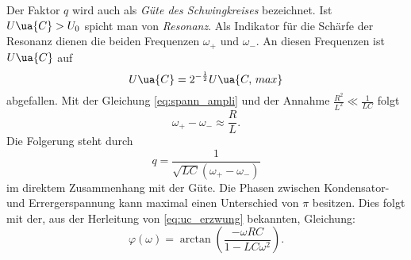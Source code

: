 Der Faktor $q$ wird auch als \emph{Güte des Schwingkreises} bezeichnet.
Ist $U\ua{C}>U_{0}$ spicht man von \emph{Resonanz}.
Als Indikator für die Schärfe der Resonanz dienen die beiden
Frequenzen $\omega_+$ und $\omega_-$. An diesen Frequenzen ist
$U\ua{C}$ auf
\begin{equation*}
   U\ua{C}=2^{-\frac{1}{2}} U\ua{C,\, max}
\end{equation*}
abgefallen.
Mit der Gleichung \eqref{eq:spann_ampli} und der Annahme $\frac{R^2}{L^2}\ll \frac{1}{LC}$
folgt
\begin{equation}
  \label{eq:omega_+_-}
  \omega_+-\omega_-\approx \frac{R}{L}.
\end{equation}
Die Folgerung steht durch %
\begin{equation*}
  q=\frac{1}{\sqrt{LC}\left(\omega_+-\omega_-\right)}
  \label{eq: resonanzüberhöhung}
\end{equation*}
im direktem Zusammenhang mit der Güte.
Die Phasen zwischen Kondensator- und Errergerspannung kann maximal
einen Unterschied von $\pi$ besitzen. Dies folgt mit der, aus der
Herleitung von \eqref{eq:uc_erzwung} bekannten, Gleichung:
\begin{equation}
  \label{eq:phase}
  \varphi(\omega)=\arctan\left(\frac{-\omega RC}{1-LC\omega^2}\right).
\end{equation}
